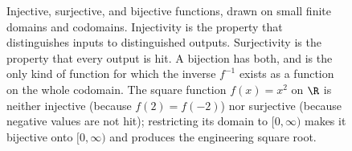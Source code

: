 \begin{figure}[htbp]
\begin{tikzpicture}
\end{tikzpicture}
\caption[Three classes of function on finite sets]{Injective,
surjective, and bijective functions, drawn on small finite domains
and codomains. Injectivity is the property that distinguishes inputs
to distinguished outputs. Surjectivity is the property that every
output is hit. A bijection has both, and is the only kind of function
for which the inverse $f^{-1}$ exists as a function on the whole
codomain. The square function $f(x) = x^{2}$ on $\R$ is neither
injective (because $f(2) = f(-2)$) nor surjective (because negative
values are not hit); restricting its domain to $[0, \infty)$ makes
it bijective onto $[0, \infty)$ and produces the engineering square
root.}
\label{fig:vol02:ch01:function-classes}
\end{figure}
